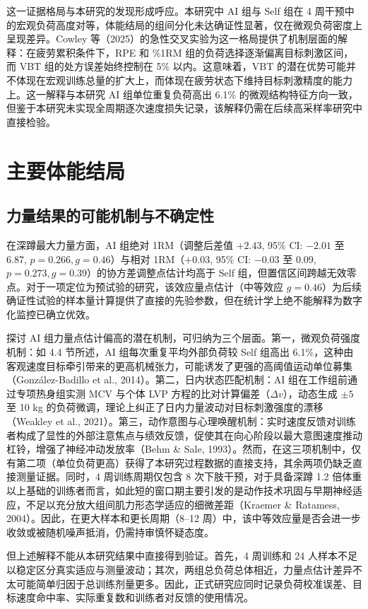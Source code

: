 \documentclass[UTF8,zihao=-4,twoside,openany]{ctexbook}
\begin{document}
这一证据格局与本研究的发现形成呼应。本研究中 AI 组与 Self 组在 4 周干预中的宏观负荷高度对等，体能结局的组间分化未达确证性显著，仅在微观负荷密度上呈现差异。Cowley 等（2025）的急性交叉实验为这一格局提供了机制层面的解释：在疲劳累积条件下，RPE 和 \%1RM 组的负荷选择逐渐偏离目标刺激区间，而 VBT 组的处方误差始终控制在 5\% 以内。这意味着，VBT 的潜在优势可能并不体现在宏观训练总量的扩大上，而体现在疲劳状态下维持目标刺激精度的能力上。这一解释与本研究 AI 组单位重复负荷高出 6.1\% 的微观结构特征方向一致，但鉴于本研究未实现全周期逐次速度损失记录，该解释仍需在后续高采样率研究中直接检验。

\section{主要体能结局}

\subsection{力量结果的可能机制与不确定性}
在深蹲最大力量方面，AI 组绝对 1RM（调整后差值 $+2.43$, 95\% CI: $-2.01$ 至 6.87, $p=0.266, g=0.46$）与相对 1RM（$+0.03$, 95\% CI: $-0.03$ 至 0.09, $p=0.273, g=0.39$）的协方差调整点估计均高于 Self 组，但置信区间跨越无效零点。对于一项定位为预试验的研究，该效应量点估计（中等效应 $g=0.46$）为后续确证性试验的样本量计算提供了直接的先验参数，但在统计学上绝不能解释为数字化监控已确立优效。

探讨 AI 组力量点估计偏高的潜在机制，可归纳为三个层面。第一，微观负荷强度机制：如 4.4 节所述，AI 组每次重复平均外部负荷较 Self 组高出 6.1\%，这种由客观速度目标牵引带来的更高机械张力，可能诱发了更强的高阈值运动单位募集（González-Badillo et al., 2014）。第二，日内状态匹配机制：AI 组在工作组前通过专项热身组实测 MCV 与个体 LVP 方程的比对计算偏差（$\Delta v$），动态生成 $\pm 5$ 至 10 kg 的负荷微调，理论上纠正了日内力量波动对目标刺激强度的漂移（Weakley et al., 2021）。第三，动作意图与心理唤醒机制：实时速度反馈对训练者构成了显性的外部注意焦点与绩效反馈，促使其在向心阶段以最大意图速度推动杠铃，增强了神经冲动发放率（Behm \& Sale, 1993）。然而，在这三项机制中，仅有第二项（单位负荷更高）获得了本研究过程数据的直接支持，其余两项仍缺乏直接测量证据。同时，4 周训练周期仅包含 8 次下肢干预，对于具备深蹲 1.2 倍体重以上基础的训练者而言，如此短的窗口期主要引发的是动作技术巩固与早期神经适应，不足以充分放大组间肌力形态学适应的细微差距（Kraemer \& Ratamess, 2004）。因此，在更大样本和更长周期（8--12 周）中，该中等效应量是否会进一步收敛或被随机噪声抵消，仍需持审慎怀疑态度。

但上述解释不能从本研究结果中直接得到验证。首先，4 周训练和 24 人样本不足以稳定区分真实适应与测量波动；其次，两组总负荷总体相近，力量点估计差异不太可能简单归因于总训练剂量更多。因此，正式研究应同时记录负荷校准误差、目标速度命中率、实际重复数和训练者对反馈的使用情况。
\end{document}
